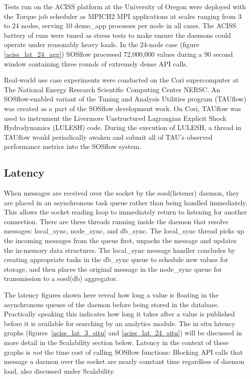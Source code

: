 Tests run on the ACISS platform at the University of Oregon were
deployed with the Torque job scheduler as MPICH2 MPI applications at
scales ranging from 3 to 24 nodes, serving 10 demo\_app processes per
node in all cases.
%
The ACISS battery of runs were tuned as stress tests to make ensure
the daemons could operate under reasonably heavy loads.
%
In the 24-node case (figure \ref{aciss_lat_24_agg}) SOSflow processed
72,000,000 values during a 90 second window containing three rounds of
extremely dense API calls.

Real-world use case experiments were conducted on the Cori
supercomputer at The National Energy Research Scientific Computing
Center NERSC.
%
An SOSflow-enabled variant of the Tuning and Analysis
Utilities program (TAUflow) was created as a part of the SOSflow
development work.
%
On Cori, TAUflow was used to instrument the Livermore Unstructured
Lagrangian Explicit Shock Hydrodynamics (LULESH) code.
%
During the execution of LULESH, a thread in TAUflow would periodically
awaken and submit all of TAU's observed performance metrics into the
SOSflow system.


\subsection{Latency}

When messages are received over the socket by the sosd(listener)
daemon, they are placed in an asynchronous task queue rather than
being handled immediately.
%
This allows the socket reading loop to immediately return to listening
for another connection.
%
There are three threads running inside the daemon that resolve
messages: local\_sync, node\_sync, and db\_sync.
%
The local\_sync thread picks up the incoming messages from the queue
first, unpacks the message and updates the in-memory data
structures.
%
The local\_sync message handler concludes by creating appropriate
tasks in the db\_sync queue to schedule new values for storage, and
then places the original message in the node\_sync queue for
transmission to a sosd(db) aggregator.

The latency figures shown here reveal how long a value is floating in
the asynchronous queues of the daemon before being stored in the
database.
%
Practically speaking this indicates how long it takes after a value is
published before it is available for searching by an analytics module.
%
The in situ latency graphs (figures~\ref{aciss_lat_3_situ} and
\ref{aciss_lat_24_situ}) will be discussed in more detail in the
Scalability section below.
%
Latency in the context of these graphs is \textit{not} the time cost
of calling SOSflow functions: Blocking API calls that message a daemon
over the socket are nearly constant time regardless of daemon load,
also discussed under Scalability.

